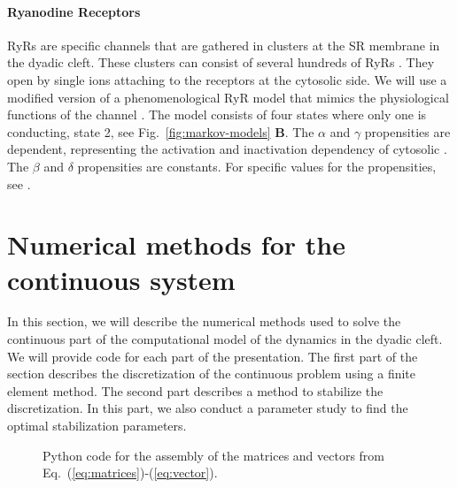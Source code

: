 \paragraph*{Ryanodine Receptors}
\label{sec:ryr}
RyRs are \Ca specific channels that are gathered in clusters at the SR membrane in the dyadic cleft. These clusters can consist of several hundreds of RyRs \cite{BeuckelmannWier1988,Franzini-ArmstrongProtasiEtAl1999}. They open by single \Ca ions attaching to the receptors at the cytosolic side. We will use a modified version of a phenomenological RyR model that mimics the physiological functions of the channel \cite{SternSongEtAl1999}. The model consists of four states where only one is conducting, state 2, see Fig.~\ref{fig:markov-models} \textbf{B}. The $\alpha$ and $\gamma$ propensities are \Ca dependent, representing the activation and inactivation dependency of cytosolic \CaC. The $\beta$ and $\delta$ propensities are constants. For specific values for the propensities, see \citet{SternSongEtAl1999}.\par

\section{Numerical methods for the continuous system}
In this section, we will describe the numerical methods used to solve the continuous part of the computational model of the \Ca dynamics in the dyadic cleft. We will provide \pydolfin code for each part of the presentation. The first part of the section describes the discretization of the continuous problem using a finite element method. The second part describes a method to stabilize the discretization. In this part, we also conduct a parameter study to find the optimal stabilization parameters.\par
\begin{figure}
  \centering
  \vspace{-1.5em}
  \caption{Python code for the assembly of the matrices and vectors from Eq.~(\ref{eq:matrices})-(\ref{eq:vector}).}
  \label{fig:assembly-algorithm}
\end{figure}

